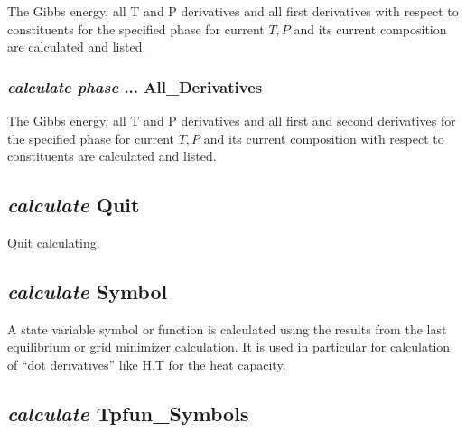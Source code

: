 \documentclass[12pt]{article}
\begin{document}
The Gibbs energy, all T and P derivatives and all first derivatives
with respect to constituents for the specified phase for current $T,P$
and its current composition are calculated and listed.

\subsubsection{{\em calculate phase} ... All\_Derivatives}

The Gibbs energy, all T and P derivatives and all first and second
derivatives for the specified phase for current $T,P$ and its current
composition with respect to constituents are calculated and listed.

\subsection{{\em calculate} Quit}

Quit calculating.

\subsection{{\em calculate} Symbol}

A state variable symbol or function is calculated using the results
from the last equilibrium or grid minimizer calculation.  It is used
in particular for calculation of ``dot derivatives'' like H.T for the
heat capacity.

\subsection{{\em calculate} Tpfun\_Symbols}
\end{document}
